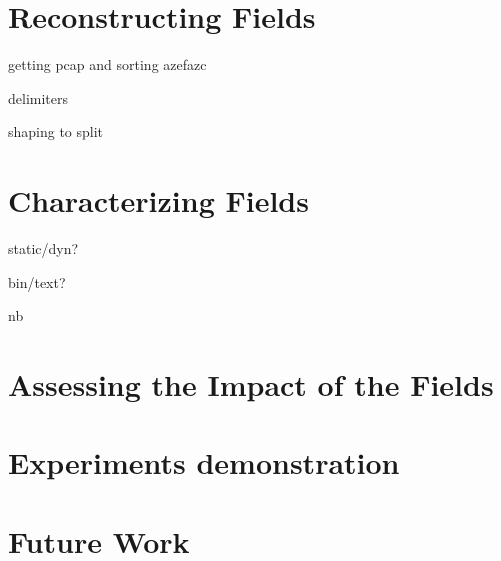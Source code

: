\documentclass{beamer}
\newcounter{m} %
\newcounter{c} %
\begin{document}
\section{Reconstructing Fields}
\begin{frame}

	\tableofcontents[currentsection]
\end{frame}

\begin{frame}{getting pcap and sorting}
azefazc
\end{frame}

%
\begin{frame}
delimiters

shaping to split

\end{frame}

\section {Characterizing Fields}
\begin{frame}

	\tableofcontents[currentsection]
\end{frame}

\begin{frame}
static/dyn?

bin/text?

nb
\end{frame}


\section{Assessing the Impact of the Fields}
\begin{frame}

	\tableofcontents[currentsection]
\end{frame}



\section{Experiments demonstration}
\begin{frame}

	\tableofcontents[currentsection]
\end{frame}

\section{Future Work}
\begin{frame}

	\tableofcontents[currentsection]
\end{frame}
\end{document}
